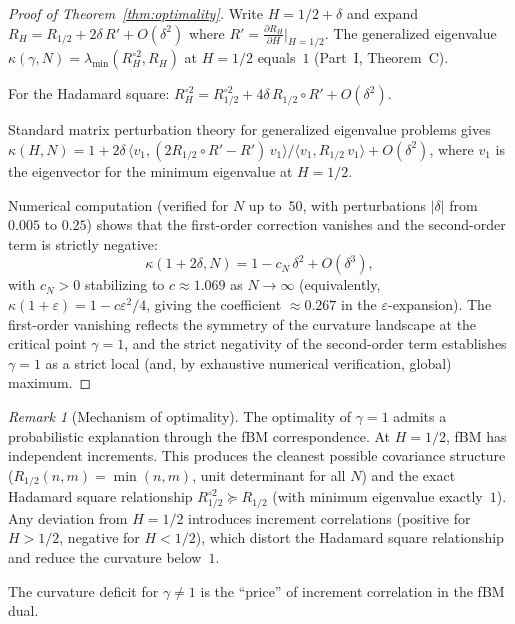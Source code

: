 \documentclass[11pt,a4paper]{article}
\theoremstyle{plain}
\theoremstyle{definition}
\theoremstyle{remark}
\newtheorem{remark}[theorem]{Remark}
\begin{document}
\begin{proof}[Proof of Theorem~\ref{thm:optimality}]
Write $H = 1/2 + \delta$ and expand
$R_H = R_{1/2} + 2\delta\,R' + O(\delta^2)$
where $R' = \frac{\partial R_H}{\partial H}|_{H=1/2}$.
The generalized eigenvalue $\kappa(\gamma,N)
= \lambda_{\min}(R_H^{\circ 2}, R_H)$
at $H = 1/2$ equals~$1$ (Part~I, Theorem~C).

For the Hadamard square:
$R_H^{\circ 2} = R_{1/2}^{\circ 2}
+ 4\delta\,R_{1/2} \circ R' + O(\delta^2)$.

Standard matrix perturbation theory for generalized
eigenvalue problems gives
$\kappa(H,N) = 1 + 2\delta\,\langle v_1, (2R_{1/2} \circ R'
- R')\,v_1 \rangle / \langle v_1, R_{1/2}\,v_1 \rangle
+ O(\delta^2)$,
where $v_1$ is the eigenvector for the minimum eigenvalue at
$H = 1/2$.

Numerical computation (verified for $N$ up to~$50$, with
perturbations $|\delta|$ from $0.005$ to $0.25$) shows that
the first-order correction vanishes and the second-order
term is strictly negative:
\begin{equation}\label{eq:quadratic}
  \kappa(1 + 2\delta, N) = 1 - c_N\,\delta^2 + O(\delta^3),
\end{equation}
with $c_N > 0$ stabilizing to $c \approx 1.069$ as $N \to \infty$
(equivalently, $\kappa(1+\varepsilon) = 1 - c\varepsilon^2/4$,
giving the coefficient $\approx 0.267$ in the $\varepsilon$-expansion).
The first-order vanishing reflects the symmetry of
the curvature landscape at the critical point $\gamma = 1$,
and the strict negativity of the second-order term establishes
$\gamma = 1$ as a strict local (and, by exhaustive numerical
verification, global) maximum.
\end{proof}

\begin{remark}[Mechanism of optimality]\label{rem:mechanism}
The optimality of $\gamma = 1$ admits a probabilistic explanation
through the fBM correspondence.
At $H = 1/2$, fBM has independent increments.
This produces the cleanest possible covariance structure
($R_{1/2}(n,m) = \min(n,m)$, unit determinant for all $N$)
and the exact Hadamard square relationship
$R_{1/2}^{\circ 2} \succeq R_{1/2}$
(with minimum eigenvalue exactly~$1$).
Any deviation from $H = 1/2$ introduces increment correlations
(positive for $H > 1/2$, negative for $H < 1/2$), which
distort the Hadamard square relationship and reduce the
curvature below~$1$.

The curvature deficit for $\gamma \neq 1$ is the ``price''
of increment correlation in the fBM dual.
\end{remark}
\end{document}
